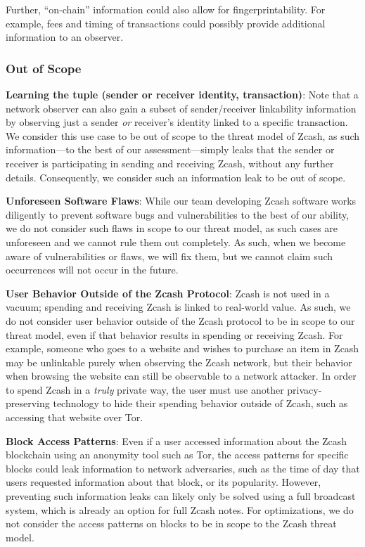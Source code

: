 \documentclass{article}
\begin{document}
Further, ``on-chain'' information could also allow for fingerprintability. For
example, fees and timing of transactions could possibly provide additional
information to an observer.

\subsubsection{Out of Scope}
\label{out-of-scope}

\textbf{Learning the tuple (sender or receiver identity, transaction)}:
Note that a network observer can also gain a subset of sender/receiver
linkability information by
observing just a sender \emph{or} receiver's identity linked to a specific
transaction. We consider this use case to be out of scope to the threat model
of Zcash, as such
information---to the best of our assessment---simply leaks that the sender or
receiver is participating in sending and receiving Zcash, without any further
details. Consequently, we consider such an information leak to be out of scope.

\textbf{Unforeseen Software Flaws}: While our team developing Zcash software
works diligently to prevent software bugs and vulnerabilities to the best of
our ability, we do not
consider such flaws in scope to our threat model, as such cases are unforeseen
and we cannot rule them out completely. As such, when we become aware of
vulnerabilities or flaws, we will fix them, but we cannot claim such
occurrences will not occur in the future.

\textbf{User Behavior Outside of the Zcash Protocol}: Zcash is not used in a
vacuum; spending and receiving Zcash is linked to real-world value. As such, we
do not consider user behavior outside of the Zcash protocol to be in scope to
our threat model, even if that behavior results in spending or receiving Zcash.
For example, someone who goes to a website and wishes to purchase an item in
Zcash may be unlinkable purely when observing the Zcash network, but their
behavior when browsing the website can still be observable to a network
attacker. In order to spend Zcash in a \emph{truly} private way, the user must
use another privacy-preserving technology to hide their spending behavior
outside of Zcash, such as accessing that website over Tor.

\textbf{Block Access Patterns}: Even if a user accessed
information about the Zcash blockchain using an anonymity tool such as Tor, the
access patterns for specific blocks could leak information to network
adversaries, such as the time of day that users requested information about
that block, or its popularity. However, preventing such information leaks
can likely only be solved using a full broadcast system, which is already
an option for full Zcash notes. For optimizations, we do not consider the
access patterns on blocks to be in scope to the Zcash threat model.
\end{document}
